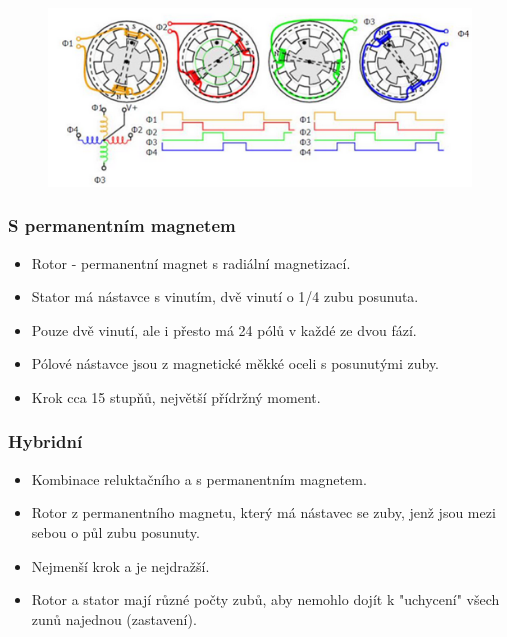 \begin{figure}[h]
    \begin{center}
        \includegraphics[scale = 1]{img/picture7.png}
    \end{center}
\end{figure}

\subsubsection*{S permanentním magnetem}
\begin{itemize}
    \item Rotor - permanentní magnet s radiální magnetizací.
    \item Stator má nástavce s vinutím, dvě vinutí o 1/4 zubu posunuta.
    \item Pouze dvě vinutí, ale i přesto má 24 pólů v každé ze dvou fází.
    \item Pólové nástavce jsou z magnetické měkké oceli s posunutými zuby.
    \item Krok cca 15 stupňů, největší přídržný moment.
\end{itemize}

\subsubsection*{Hybridní}
\begin{itemize}
    \item Kombinace reluktačního a s permanentním magnetem.
    \item Rotor z permanentního magnetu, který má nástavec se zuby, jenž jsou mezi sebou o půl zubu posunuty.
    \item Nejmenší krok a je nejdražší.
    \item Rotor a stator mají různé počty zubů, aby nemohlo dojít k "uchycení" všech zunů najednou (zastavení).
\end{itemize}

